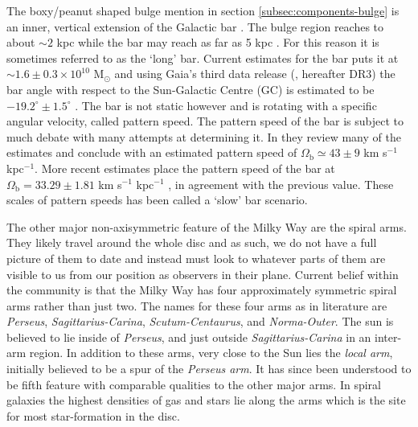 The boxy/peanut shaped bulge mention in section \ref{subsec:components-bulge} is an inner, vertical extension of the Galactic bar \citep{bland-hawthorn:16}. The bulge region reaches to about ${\sim}2$ kpc \citep{wegg:13} while the bar may reach as far as 5 kpc \citep{wegg:15}. For this reason it is sometimes referred to as the `long' bar. Current estimates for the bar puts it at ${\sim}1.6\pm 0.3 \times 10^10$ M$_\odot$ \citep{kipper:20} and using Gaia's third data release (\citealt{dr3}, hereafter DR3) the bar angle with respect to the Sun-Galactic Centre (GC) is estimated to be $-19.2^\circ \pm 1.5^\circ$ \citep{dr3:asymmetries}. The bar is not static however and is rotating with a specific angular velocity, called pattern speed. The pattern speed of the bar is subject to much debate with many attempts at determining it. In \cite{bland-hawthorn:16} they review many of the estimates and conclude with an estimated pattern speed of $\Omega_\mathrm{b} \simeq 43 \pm 9$ km s$^{-1}$ kpc$^{-1}$. More recent estimates place the pattern speed of the bar at $\Omega_\mathrm{b} = 33.29 \pm 1.81$ km s$^{-1}$ kpc$^{-1}$ \citep{clarke:22}, in agreement with the previous value. These scales of pattern speeds has been called a `slow' bar scenario.

The other major non-axisymmetric feature of the Milky Way are the spiral arms. They likely travel around the whole disc and as such, we do not have a full picture of them to date and instead must look to whatever parts of them are visible to us from our position as observers in their plane. Current belief within the community is that the Milky Way has four approximately symmetric spiral arms \citep{vallee:17} rather than just two. The names for these four arms as in literature are \textit{Perseus}, \textit{Sagittarius-Carina}, \textit{Scutum-Centaurus}, and \textit{Norma-Outer}. The sun is believed to lie inside of \textit{Perseus}, and just outside \textit{Sagittarius-Carina} in an inter-arm region. In addition to these arms, very close to the Sun lies the \textit{local arm}, initially believed to be a spur of the \textit{Perseus arm}. It has since been understood to be fifth feature with comparable qualities to the other major arms. In spiral galaxies the highest densities of gas and stars lie along the arms which is the site for most star-formation in the disc. 

